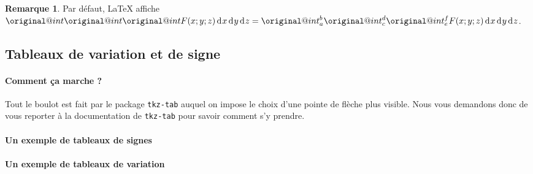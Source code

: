 \documentclass[12pt,a4paper]{article}
\theoremstyle{definition}
\newtheorem*{remark}{Remarque}
\begin{document}
\begin{remark}
	Par défaut, \LaTeX{} affiche
	\makeatletter
    	$\displaystyle \original@int \original@int \original@int F(x;y;z) \dd{x} \dd{y} \dd{z}
    	= \original@int_{a}^{b} \original@int_{c}^{d} \original@int_{e}^{f} F(x;y;z) \dd{x} \dd{y} \dd{z}$.
	\makeatother
\end{remark}





\subsection{Tableaux de variation et de signe}

\paragraph{Comment ça marche ?}

Tout le boulot est fait par le package \verb+tkz-tab+ auquel on impose le choix d'une pointe de flèche plus visible. Nous vous demandons donc de vous reporter à la documentation de \verb+tkz-tab+ pour savoir comment s'y prendre.


\paragraph{Un exemple de tableaux de signes}

\begin{tcblisting}{}
\end{tcblisting}


\paragraph{Un exemple de tableaux de variation}

\begin{tcblisting}{}
\end{tcblisting}
\end{document}
